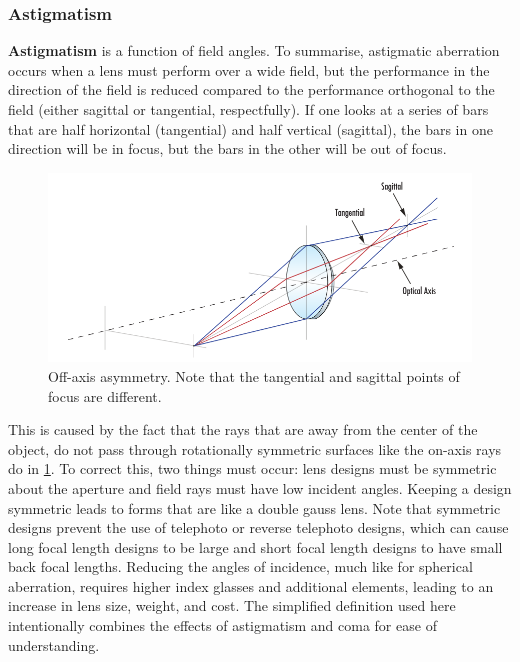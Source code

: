 \documentclass[10pt]{article}
\begin{document}
\begin{multicols}{2}
\subsubsection{Astigmatism}
\textbf{Astigmatism} is a function of field angles. To summarise, astigmatic aberration occurs when a lens must perform over a wide field, but the performance in the direction of the field is reduced compared to the performance orthogonal to the field (either sagittal or tangential, respectfully). If one looks at a series of bars that are half horizontal (tangential) and half vertical (sagittal), the bars in one direction will be in focus, but the bars in the other will be out of focus.
\begin{figure}[H]
    \centering
    \includegraphics[width=0.8\linewidth]{Images/Week 1/astigmatism.png}
    \caption{Off-axis asymmetry. Note that the tangential and sagittal points of focus are different.}
    \label{fig:astigmatism}
\end{figure}
This is caused by the fact that the rays that are away from the center of the object, do not pass through rotationally symmetric surfaces like the on-axis rays do in \ref{fig:astigmatism}. To correct this, two things must occur: lens designs must be symmetric about the aperture and field rays must have low incident angles. Keeping a design symmetric leads to forms that are like a double gauss lens. Note that symmetric designs prevent the use of telephoto or reverse telephoto designs, which can cause long focal length designs to be large and short focal length designs to have small back focal lengths. Reducing the angles of incidence, much like for spherical aberration, requires higher index glasses and additional elements, leading to an increase in lens size, weight, and cost. The simplified definition used here intentionally combines the effects of astigmatism and coma for ease of understanding.
\newline \newline

\end{multicols}
\end{document}
